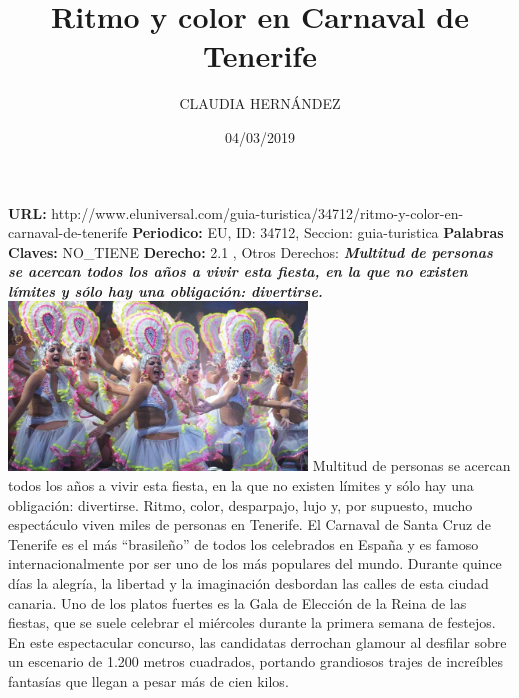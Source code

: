 \documentclass{article}%
\title{\textbf{Ritmo y color en Carnaval de Tenerife}}%
\author{CLAUDIA HERNÁNDEZ}%
\date{04/03/2019}%
\begin{document}
%
\normalsize%
\maketitle%
\textbf{URL: }%
http://www.eluniversal.com/guia{-}turistica/34712/ritmo{-}y{-}color{-}en{-}carnaval{-}de{-}tenerife\newline%
%
\textbf{Periodico: }%
EU, %
ID: %
34712, %
Seccion: %
guia{-}turistica\newline%
%
\textbf{Palabras Claves: }%
NO\_TIENE\newline%
%
\textbf{Derecho: }%
2.1%
, Otros Derechos: %
\newline%
%
\textbf{\textit{Multitud de personas se acercan todos los años a vivir esta fiesta, en la que no existen límites y sólo hay una obligación: divertirse.}}%
\newline%
\newline%
%
\includegraphics[width=300px]{EU_34712.jpg}%
\newline%
%
Multitud de personas se acercan todos los años a vivir esta fiesta, en la que no existen límites y sólo hay una obligación: divertirse.%
\newline%
%
Ritmo, color, desparpajo, lujo y, por supuesto, mucho espectáculo viven miles de personas en Tenerife.%
\newline%
%
El Carnaval de Santa Cruz de Tenerife es el más “brasileño” de todos los celebrados en España y es famoso internacionalmente por ser uno de los más populares del mundo.%
\newline%
%
Durante quince días la alegría, la libertad y la imaginación desbordan las calles de esta ciudad canaria.%
\newline%
%
Uno de los platos fuertes es la Gala de Elección de la Reina de las fiestas, que se suele celebrar el miércoles durante la primera semana de festejos. En este espectacular concurso, las candidatas derrochan glamour al desfilar sobre un escenario de 1.200 metros cuadrados, portando grandiosos trajes de increíbles fantasías que llegan a pesar más de cien kilos.%
\newline%
\end{document}
